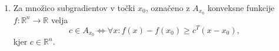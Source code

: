 \begin{enumerate}
  \item Za množico subgradientov v točki $x_0$, označeno z $A_{x_0}$ konveksne funkcije $f: \mathbb{R}^n \rightarrow \mathbb{R}$ velja 
  \[
    c \in A_{x_0} \iff \forall x: f(x) - f(x_0) \geq c^T(x - x_0),
  \] kjer $c \in \mathbb{R}^n$.
\end{enumerate}






